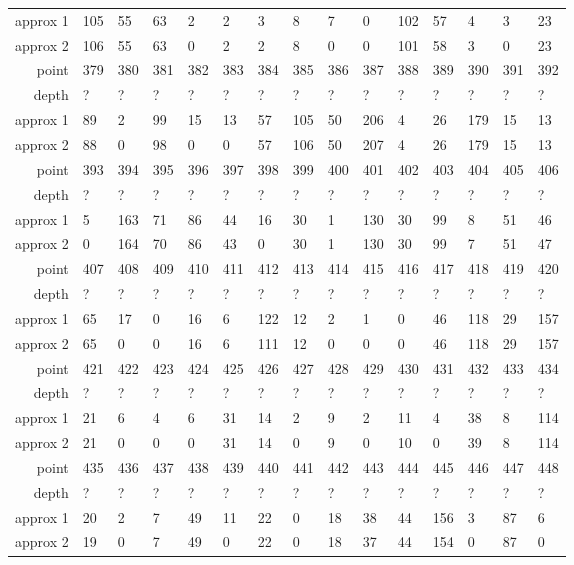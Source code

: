 \begin{center}
\begin{supertabular}{|r|l l l l l l l l l l l l l l|}
approx 1 & 105 & 55 & 63 & 2 & 2 & 3 & 8 & 7 & 0 & 102 & 57 & 4 & 3 & 23 \\
approx 2 & 106 & 55 & 63 & 0 & 2 & 2 & 8 & 0 & 0 & 101 & 58 & 3 & 0 & 23 \\
\hline
point & 379 & 380 & 381 & 382 & 383 & 384 & 385 & 386 & 387 & 388 & 389 & 390 & 391 & 392 \\
\hline
depth & ? & ? & ? & ? & ? & ? & ? & ? & ? & ? & ? & ? & ? & ? \\
approx 1 & 89 & 2 & 99 & 15 & 13 & 57 & 105 & 50 & 206 & 4 & 26 & 179 & 15 & 13 \\
approx 2 & 88 & 0 & 98 & 0 & 0 & 57 & 106 & 50 & 207 & 4 & 26 & 179 & 15 & 13 \\
\hline
point & 393 & 394 & 395 & 396 & 397 & 398 & 399 & 400 & 401 & 402 & 403 & 404 & 405 & 406 \\
\hline
depth & ? & ? & ? & ? & ? & ? & ? & ? & ? & ? & ? & ? & ? & ? \\
approx 1 & 5 & 163 & 71 & 86 & 44 & 16 & 30 & 1 & 130 & 30 & 99 & 8 & 51 & 46 \\
approx 2 & 0 & 164 & 70 & 86 & 43 & 0 & 30 & 1 & 130 & 30 & 99 & 7 & 51 & 47 \\
\hline
point & 407 & 408 & 409 & 410 & 411 & 412 & 413 & 414 & 415 & 416 & 417 & 418 & 419 & 420 \\
\hline
depth & ? & ? & ? & ? & ? & ? & ? & ? & ? & ? & ? & ? & ? & ? \\
approx 1 & 65 & 17 & 0 & 16 & 6 & 122 & 12 & 2 & 1 & 0 & 46 & 118 & 29 & 157 \\
approx 2 & 65 & 0 & 0 & 16 & 6 & 111 & 12 & 0 & 0 & 0 & 46 & 118 & 29 & 157 \\
\hline
point & 421 & 422 & 423 & 424 & 425 & 426 & 427 & 428 & 429 & 430 & 431 & 432 & 433 & 434 \\
\hline
depth & ? & ? & ? & ? & ? & ? & ? & ? & ? & ? & ? & ? & ? & ? \\
approx 1 & 21 & 6 & 4 & 6 & 31 & 14 & 2 & 9 & 2 & 11 & 4 & 38 & 8 & 114 \\
approx 2 & 21 & 0 & 0 & 0 & 31 & 14 & 0 & 9 & 0 & 10 & 0 & 39 & 8 & 114 \\
\hline
point & 435 & 436 & 437 & 438 & 439 & 440 & 441 & 442 & 443 & 444 & 445 & 446 & 447 & 448 \\
\hline
depth & ? & ? & ? & ? & ? & ? & ? & ? & ? & ? & ? & ? & ? & ? \\
approx 1 & 20 & 2 & 7 & 49 & 11 & 22 & 0 & 18 & 38 & 44 & 156 & 3 & 87 & 6 \\
approx 2 & 19 & 0 & 7 & 49 & 0 & 22 & 0 & 18 & 37 & 44 & 154 & 0 & 87 & 0 \\

\end{supertabular}
\end{center}
